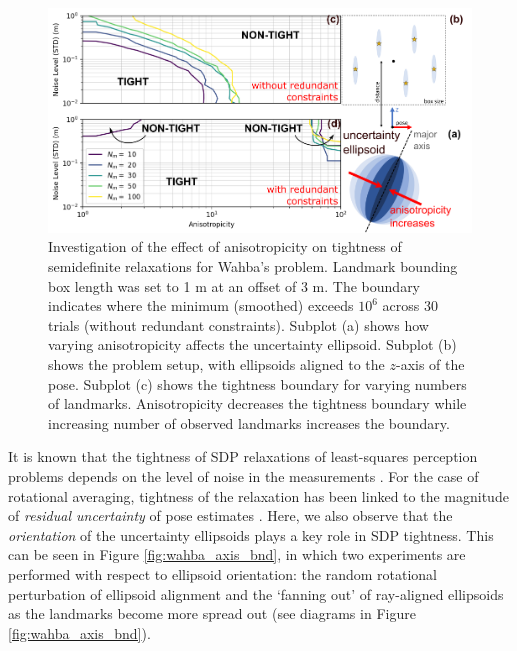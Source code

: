 \documentclass[lettersize,journal]{IEEEtran}
\newcommand{\rev}[1]{\color{red}{#1}\color{black}}
\begin{document}
\begin{figure}[!t]
	\centering
	\includegraphics[width=\columnwidth]{figs/elliposoid_align_fig.png}
	\caption{Investigation of the effect of anisotropicity on tightness of semidefinite relaxations for Wahba's problem. Landmark bounding box length was set to 1 m at an offset of 3 m. The boundary indicates where the minimum (smoothed) \rev{ER } exceeds $ 10^{6}$ across 30 trials (without redundant constraints). Subplot (a) shows how varying anisotropicity affects the uncertainty ellipsoid. Subplot (b) shows the problem setup, with ellipsoids aligned to the $z$-axis of the pose. Subplot (c) shows the tightness boundary for varying numbers of landmarks. Anisotropicity decreases the tightness boundary while increasing number of observed landmarks increases the boundary.}
	\label{fig:ellipsoid_align}
\end{figure}

It is known that the tightness of SDP relaxations of least-squares perception problems depends on the level of noise in the measurements \cite{brialesConvexGlobal3D2017, rosenSESyncCertifiablyCorrect2019, cifuentesLocalStabilitySemidefinite2022}. For the case of rotational averaging, tightness of the relaxation has been linked to the magnitude of \textit{residual uncertainty} of pose estimates \cite{erikssonRotationAveragingStrong2018}. Here, we also observe that the \emph{orientation} of the uncertainty ellipsoids plays a key role in SDP tightness. This can be seen in Figure \ref{fig:wahba_axis_bnd}, in which two experiments are performed with respect to ellipsoid orientation: the random rotational perturbation of ellipsoid alignment and the `fanning out' of ray-aligned ellipsoids as the landmarks become more spread out (see diagrams in Figure \ref{fig:wahba_axis_bnd}).
\end{document}
